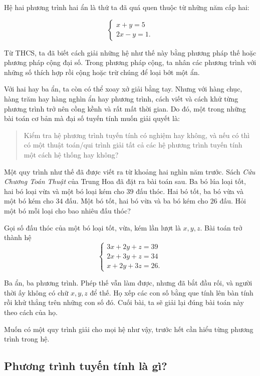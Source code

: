 \documentclass[12pt,a4paper]{article}
\begin{document}
Hệ hai phương trình hai ẩn là thứ ta đã quá quen thuộc từ những năm cấp hai:

$$ \begin{cases} x+y=5\\ 2x-y=1. \end{cases} $$

Từ THCS, ta đã biết cách giải những hệ như thế này bằng phương pháp thế hoặc phương pháp cộng đại số. Trong phương pháp cộng, ta nhân các phương trình với những số thích hợp rồi cộng hoặc trừ chúng để loại bớt một ẩn.

Với hai hay ba ẩn, ta còn có thể xoay xở giải bằng tay. Nhưng với hàng chục, hàng trăm hay hàng nghìn ẩn hay phương trình, cách viết và cách khử từng phương trình trở nên cồng kềnh và rất mất thời gian. Do đó, một trong những bài toán cơ bản mà đại số tuyến tính muốn giải quyết là:

\begin{quote}
Kiểm tra hệ phương trình tuyến tính có nghiệm hay không, và nếu có thì có một thuật toán/qui trình giải tất cả các hệ phương trình tuyến tính một cách hệ thống hay không?
\end{quote}

Một quy trình như thế đã được viết ra từ khoảng hai nghìn năm trước. Sách \emph{Cửu Chương Toán Thuật} của Trung Hoa đã đặt ra bài toán sau. Ba bó lúa loại tốt, hai bó loại vừa và một bó loại kém cho \(39\) đấu thóc. Hai bó tốt, ba bó vừa và một bó kém cho \(34\) đấu. Một bó tốt, hai bó vừa và ba bó kém cho \(26\) đấu. Hỏi một bó mỗi loại cho bao nhiêu đấu thóc?

Gọi số đấu thóc của một bó loại tốt, vừa, kém lần lượt là \(x,y,z\). Bài toán trở thành hệ
$$ \begin{cases} 3x+2y+z=39\\ 2x+3y+z=34\\ x+2y+3z=26. \end{cases} $$

Ba ẩn, ba phương trình. Phép thế vẫn làm được, nhưng đã bắt đầu rối, và người thời ấy không có chữ \(x,y,z\) để thế. Họ xếp các con số bằng que tính lên bàn tính rồi khử thẳng trên những con số đó. Cuối bài, ta sẽ giải lại đúng bài toán này theo cách của họ.

Muốn có một quy trình giải cho mọi hệ như vậy, trước hết cần hiểu từng phương trình trong hệ.

\subsection{Phương trình tuyến tính là gì?}
\end{document}

